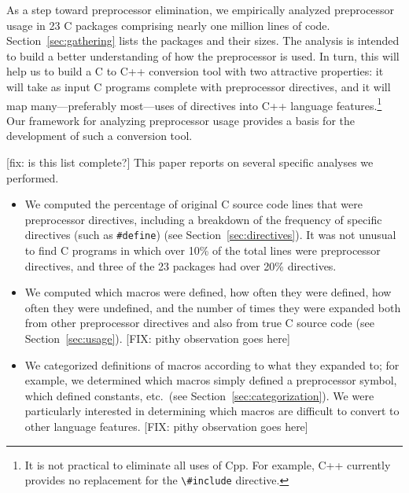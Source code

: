 As a step toward preprocessor elimination, we empirically analyzed
preprocessor usage in 23 C packages comprising nearly one million lines of
code.  Section~\ref{sec:gathering} lists the packages and their sizes.  The
analysis is intended to build a better understanding of how the
preprocessor is used.  In turn, this will help us to build a C to C++
conversion tool with two attractive properties: it will take as input C
programs complete with preprocessor directives, and it will map
many---preferably most---uses of directives into C++ language
features.\footnote{It is not practical to eliminate all uses of Cpp.  For
  example, C++ currently provides no replacement for the \verb+\#include+
  directive.} Our framework for analyzing preprocessor usage provides a
basis for the development of such a conversion tool.

[fix: is this list complete?]
This paper reports on several specific analyses we performed.
\begin{itemize}\itemsep 0pt \parskip 0pt

\item We computed the percentage of original C source code lines that
were preprocessor directives, including a breakdown of the frequency
of specific directives (such as \verb+#define+) (see
Section~\ref{sec:directives}). It was not unusual to find C programs 
in which over 10\% of the total lines were preprocessor directives, and 
three of the 23 packages had over 20\% directives.

\item We computed which macros were defined, how often they were
defined, how often they were undefined, and the number of times they
were expanded both from other preprocessor directives and also from
true C source code (see Section~\ref{sec:usage}).
[FIX: pithy observation goes here]

\item We categorized definitions of macros according to what they
      expanded to; for example, we determined which macros simply
      defined a preprocessor symbol, which defined constants, etc.~(see
      Section~\ref{sec:categorization}).  We
      were particularly interested in determining which macros are
      difficult to convert to other language
      features.  [FIX: pithy observation goes here]

\end{itemize}

